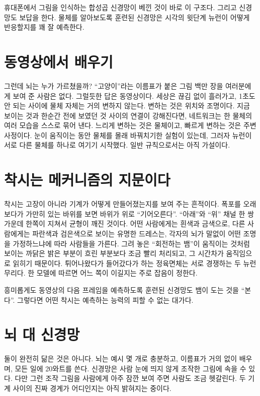 휴대폰에서 그림을 인식하는 합성곱 신경망이 베낀 것이 바로 이 구조다. 그리고 신경망도 보답을 한다. 물체를 알아보도록 훈련된 신경망은 시각의 윗단계 뉴런이 어떻게 반응할지를 꽤 잘 예측한다.

\section*{동영상에서 배우기}

그런데 뇌는 누가 가르쳤을까? “고양이”라는 이름표가 붙은 그림 백만 장을 여러분에게 보여 준 사람은 없다. 그럴듯한 답은 동영상이다. 세상은 끊김 없이 흘러가고, 1초도 안 되는 사이에 물체 자체는 거의 변하지 않는다. 변하는 것은 위치와 조명이다. 지금 보이는 것과 한순간 전에 보였던 것 사이의 연결이 강해진다면, 네트워크는 한 물체의 여러 모습을 스스로 묶어 낸다. 느리게 변하는 것은 물체이고, 빠르게 변하는 것은 주변 사정이다. 눈이 움직이는 동안 물체를 몰래 바꿔치기한 실험이 있는데, 그러자 뉴런이 서로 다른 물체를 하나로 여기기 시작했다. 일반 규칙으로서는 아직 가설이다.

\section*{착시는 메커니즘의 지문이다}

착시는 고장이 아니라 기계가 어떻게 만들어졌는지를 보여 주는 흔적이다. 폭포를 오래 보다가 가만히 있는 바위를 보면 바위가 위로 “기어오른다”. “아래”와 “위” 채널 한 쌍 가운데 한쪽이 지쳐서 균형이 깨진 것이다. 어떤 사람에게는 흰색과 금색으로, 다른 사람에게는 파란색과 검은색으로 보이는 유명한 드레스는, 각자의 뇌가 말없이 어떤 조명을 가정하느냐에 따라 사람들을 가른다. 그려 놓은 “회전하는 뱀”이 움직이는 것처럼 보이는 까닭은 밝은 부분이 흐린 부분보다 조금 빨리 처리되고, 그 시간차가 움직임으로 읽히기 때문이다. 튀어나왔다가 들어갔다가 하는 정육면체는 서로 경쟁하는 두 뉴런 무리다. 한 모델에 따르면 어느 쪽이 이길지는 주로 잡음이 정한다.

흥미롭게도 동영상의 다음 프레임을 예측하도록 훈련된 신경망도 뱀이 도는 것을 “본다”. 그렇다면 어떤 착시는 예측하는 능력의 피할 수 없는 대가다.

\section*{뇌 대 신경망}

둘이 완전히 닮은 것은 아니다. 뇌는 예시 몇 개로 충분하고, 이름표가 거의 없이 배우며, 모든 일에 20와트를 쓴다. 신경망은 사람 눈에 띄지 않게 조작한 그림에 속을 수 있다. 다만 그런 조작 그림을 사람에게 아주 잠깐 보여 주면 사람도 조금 헷갈린다. 두 기계 사이의 진짜 경계가 어디인지는 아직 밝혀지는 중이다.

